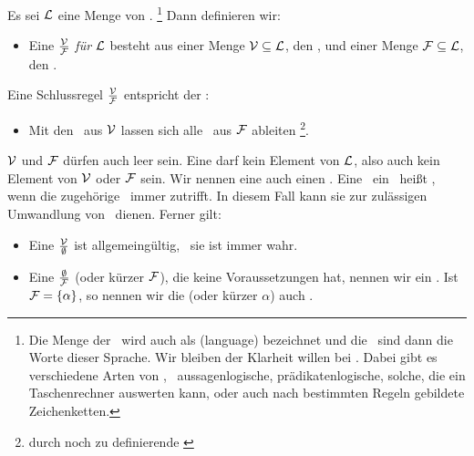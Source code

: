 Es sei $\mathcal{L}$ eine Menge von \Formeln.%
	\footnote{%
	Die Menge der \Formeln\ wird auch als  (language) bezeichnet und die \Formeln\ sind dann die Worte dieser Sprache.
	Wir bleiben der Klarheit willen bei \Formel.
	Dabei gibt es verschiedene Arten von \Formeln, \textzB\ aussagenlogische, prädikatenlogische, solche, die ein Taschenrechner auswerten kann, oder auch nach bestimmten Regeln gebildete Zeichenketten.
}
Dann definieren wir:
\begin{itemize}
	\item[] Eine  $\frac{\mathcal{V}}{\mathcal{F}}$ \emph{für} $\mathcal{L}$ besteht aus einer Menge $\mathcal{V}\subseteq\mathcal{L}$, den , und einer Menge $\mathcal{F}\subseteq\mathcal{L}$, den .
\end{itemize}
Eine Schlussregel $\frac{\mathcal{V}}{\mathcal{F}}$ entspricht der \Aussage:
%
\begin{itemize}
	\item[] Mit den \Voraussetzungen\ aus $\mathcal{V}$ lassen sich alle \Folgerungen\ aus $\mathcal{F}$ ableiten%
	\footnote{durch noch zu definierende \emph{}}.
\end{itemize}
%
$\mathcal{V}$ und $\mathcal{F}$ dürfen auch leer sein.
Eine  darf kein Element von $\mathcal{L}$, also auch kein Element von $\mathcal{V}$ oder $\mathcal{F}$ sein.
Wir nennen eine  auch einen \emph{}.
Eine  \textbzw\ ein \formalerSatz\ heißt , wenn die zugehörige \Aussage\ immer zutrifft.
In diesem Fall kann sie zur zulässigen Umwandlung von \Formeln\ dienen.
Ferner gilt:
%
\begin{itemize}
	\item Eine  $\frac{\mathcal{V}}{\emptyset}$ ist allgemeingültig, \textdh\ sie ist immer wahr.
	\item Eine  $\frac{\emptyset}{\mathcal{F}}$ (oder kürzer $\mathcal{F}$), die keine Voraussetzungen hat, nennen wir ein .
	Ist $\mathcal{F} = \{\alpha\}$, so nennen wir die  (oder kürzer $\alpha$) auch .
\end{itemize}

